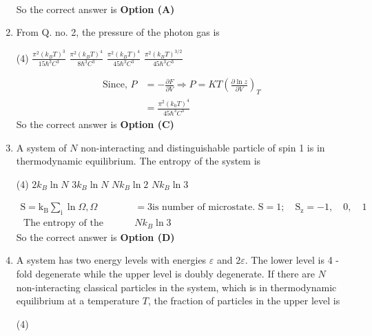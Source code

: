 \begin{enumerate}
\begin{answer}
\begin{align*}
\end{align*}
So the correct answer is \textbf{Option (A)}
\end{answer}
\item From Q. no. 2, the pressure of the photon gas is
{}
\begin{tasks}(4)
\task[\textbf{A.}] $\frac{\pi^{2}\left(k_{B} T\right)^{3}}{15 \hbar^{3} C^{3}}$
\task[\textbf{B.}]  $\frac{\pi^{2}\left(k_{B} T\right)^{4}}{8 \hbar^{3} C^{3}}$
\task[\textbf{C.}] $\frac{\pi^{2}\left(k_{B} T\right)^{4}}{45 \hbar^{3} C^{3}}$
\task[\textbf{D.}] $\frac{\pi^{2}\left(k_{B} T\right)^{3 / 2}}{45 \hbar^{3} C^{3}}$
\end{tasks}
\begin{answer}
\begin{align*}
\text{Since, }P&=-\frac{\partial F}{\partial V} \Rightarrow P=K T\left(\frac{\partial \ln z}{\partial V}\right)_{T}\\&=\frac{\pi^{2}\left(k_{0} T\right)^{4}}{45 \hbar^{3} C^{3}}
\end{align*}
So the correct answer is \textbf{Option (C)}
\end{answer}
\item A system of $N$ non-interacting and distinguishable particle of spin 1 is in thermodynamic equilibrium. The entropy of the system is
{}
\begin{tasks}(4)
\task[\textbf{A.}] $2 k_{B} \ln N$
\task[\textbf{B.}] $3 k_{B} \ln N$
\task[\textbf{C.}] $N k_{B} \ln 2$
\task[\textbf{D.}] $N k_{B} \ln 3$
\end{tasks}
\begin{answer}
\begin{align*}
\mathrm{S}=\mathrm{k}_{\mathrm{B}} \sum_{\mathrm{i}} \ln \Omega, \Omega&=3 \text{is number of microstate. }\mathrm{S}=1 ; \quad \mathrm{S}_{\mathrm{z}}=-1, \quad 0, \quad 1\\
\text{	The entropy of the system is }& N k_{B} \ln 3
\end{align*}
So the correct answer is \textbf{Option (D)}
\end{answer}	
\item A system has two energy levels with energies $\varepsilon$ and $2 \varepsilon .$ The lower level is 4 -fold degenerate while the upper level is doubly degenerate. If there are $N$ non-interacting classical particles in the system, which is in thermodynamic equilibrium at a temperature $T$, the fraction of particles in the upper level is
{}
\begin{tasks}(4)

\end{tasks}
\end{enumerate}
